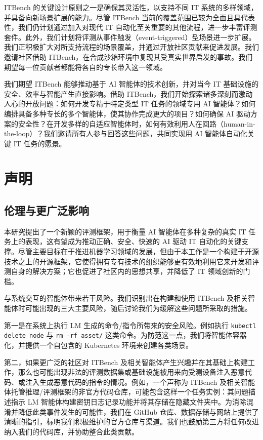 ITBench 的关键设计原则之一是确保其灵活性，以支持不同 IT 系统的多样领域，并具备向新场景扩展的能力。尽管 ITBench 当前的覆盖范围已较为全面且具代表性，我们仍计划通过加入对现代 IT 自动化至关重要的其他流程，进一步丰富评测套件。此外，我们计划将评测从事件触发（event-triggered）型场景进一步扩展。我们正积极扩大对所支持流程的场景覆盖，并通过开放社区贡献来促进发展。我们邀请社区借助 ITBench，在合成沙箱环境中复现其受真实世界启发的事故。我们期望每一位贡献者都能将各自的专长带入这一领域。

我们期望 ITBench 能够推动基于 AI 智能体的技术创新，并对当今 IT 基础设施的安全、效率与智能产生直接影响。借助 ITBench，我们开始探索诸多深刻而激动人心的开放问题：如何开发专精于特定类型 IT 任务的领域专用 AI 智能体？如何编排具备多种专长的多个智能体，使其协作完成更大的项目？如何确保 AI 驱动方案的安全性？在开发多样的自适应智能体时，如何有效利用人在回路（human-in-the-loop）？我们邀请所有人参与回答这些问题，共同实现用 AI 智能体自动化关键 IT 任务的愿景。

\section{声明}

\subsection{伦理与更广泛影响}

本研究提出了一个新颖的评测框架，用于衡量 AI 智能体在多种复杂的真实 IT 任务上的表现，这有望成为推动正确、安全、快速的 AI 驱动 IT 自动化的关键支撑。尽管主要目标在于推进机器学习领域的发展，但由于本工作是一个构建于开源技术之上的开源框架，它使得拥有专有技术的组织能够更有效地利用它来开发和评测自身的解决方案；它也促进了社区内的思想共享，并降低了 IT 领域创新的门槛。

与系统交互的智能体带来若干风险。我们识别出在构建和使用 ITBench 及相关智能体时可能出现的三大主要风险，随后讨论我们为缓解这些问题所采取的措施。

第一是在系统上执行 LM 生成的命令/指令所带来的安全风险。例如执行 \texttt{kubectl delete node} 与 \texttt{rm -rf asset/} 这类命令。为防范这一点，我们将智能体容器化，并提供一个自包含的 Kubernetes 环境来创建各类场景。

第二，如果更广泛的社区对 ITBench 及相关智能体产生兴趣并在其基础上构建工作，那么也可能出现非法的评测数据集或基础设施被用来向受测设备注入恶意代码、或注入生成恶意代码的指令的情况。例如，一个声称为 ITBench 及相关智能体托管推理/评测框架的非官方代码仓库，可能包含这样一个任务实例：其问题描述指示 LM 智能体构建密钥日志记录功能并将其存储在隐藏文件夹中。为消除混淆并降低此类事件发生的可能性，我们在 GitHub 仓库、数据存储与网站上提供了清晰的指引，标明我们积极维护的官方仓库与渠道。我们也鼓励第三方将任何改进纳入我们的代码库，并协助整合此类贡献。

